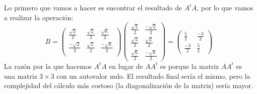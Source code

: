 Lo primero que vamos a hacer es encontrar el resultado de $A^tA$, por lo que vamos a realizar la operación:
\[
	B=
	\begin{pmatrix}
		\frac{\sqrt2}{2}  & \frac{\sqrt2}{2} & \frac{\sqrt6}{2}  \\
		\frac{-\sqrt2}{2} & \frac{\sqrt2}{2} & \frac{-\sqrt6}{2} \\
	\end{pmatrix}
	\begin{pmatrix}
		\frac{\sqrt2}{2} & \frac{-\sqrt2}{2} \\
		\frac{\sqrt2}{2} & \frac{\sqrt2}{2}  \\
		\frac{\sqrt6}{2} & \frac{-\sqrt6}{2}
	\end{pmatrix}
	=
	\begin{pmatrix}
		\frac{5}{2}  & \frac{-3}{2} \\
		\frac{-3}{2} & \frac{5}{2}
	\end{pmatrix}
\]
La razón por la que hacemos $A^tA$ en lugar de $AA^t$ es porque la matriz $AA^t$ es una matriz $3\times3$ con un autovalor nulo. El resultado final sería el mismo, pero la complejidad del cálculo más costoso (la diagonalización de la matriz) sería mayor.

